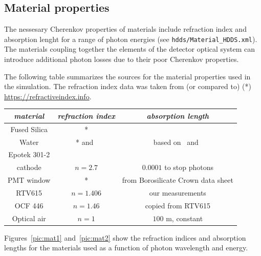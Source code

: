 \subsection{Material properties}

The nessesary Cherenkov properties of materials include refraction index and absorption lenght for a range of photon energies (see \texttt{hdds/Material{\_}HDDS.xml}). The materials coupling together the elements of the detector optical system can introduce additional photon losses due to their poor Cherenkov properties. 

The following table summarizes the sources for the material properties used in the simulation. The refraction index data was taken from (or compared to) (*) \\ \url{https://refractiveindex.info}. 

\vspace{0.5cm}
\begin{tabular}{| c | c | c |}
\hline
\textit{material} & \textit{refraction index} & \textit{absorption length} \\
\hline
Fused Silica & * & \cite{Epotek} \\
\hline
Water & * and~\cite{EpotekData} & based on~\cite{water} and~\cite{water2} \\
\hline
Epotek 301-2 & \cite{EpotekData} & \cite{Epotek} \\
\hline
cathode & $n = 2.7$ & $0.0001$ to stop photons \\
\hline
PMT window & * &  from Borosilicate Crown data sheet \\
\hline
RTV615 & $n = 1.406$ & our measurements \\
\hline
OCF 446 & $n = 1.46$ & copied from RTV615 \\
\hline
Optical air & $n = 1$ & $100$ m, constant \\
\hline
\end{tabular}
\vspace{0.5cm}

Figures~\ref{pic:mat1} and~\ref{pic:mat2} show the refraction indices and absorption lengths for the materials used as a function of photon wavelength and energy.

